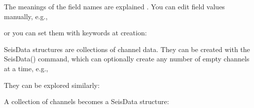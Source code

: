 \documentclass[letterpaper,11pt,english]{sphinxmanual}
\begin{document}
The meanings of the field names are explained . You can edit
field values manually, e.g.,

%
\begin{sphinxVerbatim}[commandchars=\\\{\}]
  \PYG{p}{[}    \PYG{p}{]}
  
\end{sphinxVerbatim}

or you can set them with keywords at creation:

%
\begin{sphinxVerbatim}[commandchars=\\\{\}]
  
\end{sphinxVerbatim}

SeisData structures are collections of channel data. They can be created with
the SeisData() command, which can optionally create any number of empty channels
at a time, e.g.,


\begin{fulllineitems}
\end{fulllineitems}


They can be explored similarly:

%
\begin{sphinxVerbatim}[commandchars=\\\{\}]
\PYG{p}{[}\PYG{p}{]}  
\PYG{p}{[}\PYG{p}{]}  \PYG{p}{[}    \PYG{p}{]}
\end{sphinxVerbatim}

A collection of channels becomes a SeisData structure:


\begin{fulllineitems}
\end{fulllineitems}
\end{document}
